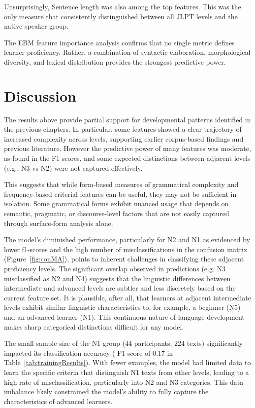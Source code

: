 Unsurprisingly, Sentence length was also among the top features. This was the only measure that consistently
distinguished between all JLPT levels and the native speaker group.

The EBM feature importance analysis confirms that no single metric defines learner proficiency. Rather, a
combination of syntactic elaboration, morphological diversity, and lexical distribution provides the strongest
predictive power.

\section{Discussion}

The results above provide partial support for developmental patterns identified in the previous chapters. In
particular, some features showed a clear trajectory of increased complexity across levels, supporting
earlier corpus-based findings and previous literature. However the predictive power of many features was moderate,
as found in the F1 scores, and some expected distinctions between adjacent levels (e.g., N3 vs N2) were not captured
effectively.

This suggests that while form-based measures of grammatical complexity and frequency-based criterial features can be
useful, they may not be sufficient in isolation. Some grammatical forms exhibit nuanced usage that depends on
semantic, pragmatic, or discourse-level factors that are not easily captured through surface-form
analysis alone.

The model's diminished performance, particularly for N2 and N1 as evidenced by lower f1-scores and the high number
of misclassifications in the confusion matrix (Figure~\ref{fig:conMA}), points to inherent challenges in
classifying these adjacent proficiency levels. The significant overlap observed in predictions (e.g. N3 misclassified
as N2 and N4) suggests that the linguistic differences between intermediate and advanced levels are subtler and less
discretely based on the current feature set. It is plausible, after all, that learners at adjacent intermediate
levels exhibit similar linguistic characteristics to, for example, a beginner (N5) and an advanced learner (N1).
This continuous nature of language development makes sharp categorical distinctions difficult for any model.

The small sample size of the N1 group (44 participants, 224 texts) significantly impacted its classification accuracy (
F1-score
of 0.17 in Table~\ref{tab:trainingResults}). With fewer examples, the model had limited data to learn the specific
criteria that distinguish N1 texts from other levels, leading to a high rate of misclassification, particularly into
N2 and N3 categories. This data imbalance likely constrained the model's ability to fully capture the
characteristics of advanced learners.


